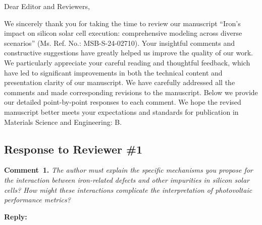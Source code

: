 \documentclass[a4paper,fleqn]{cas-sc}
\begin{document}
\shorttitle{}


%


Dear Editor and Reviewers,

We sincerely thank you for taking the time to review our manuscript
``Iron's impact on silicon solar cell execution: comprehensive modeling across diverse scenarios''
(Ms. Ref. No.: MSB-S-24-02710).
Your insightful comments and constructive suggestions have greatly helped us improve
the quality of our work.
We particularly appreciate your careful reading and thoughtful feedback, which have
led to significant improvements in both the technical content and presentation clarity of our manuscript.
We have carefully addressed all the comments and made corresponding revisions to the manuscript.
Below we provide our detailed point-by-point responses to
each comment.
We hope the revised manuscript better meets your expectations and standards for publication in Materials Science and Engineering: B.


\subsection*{Response to Reviewer \#1 }

\noindent
\textcolor[rgb]{0.00,0.50,1.00}{\textbf{Comment~1.}}
\emph{The author must explain the specific mechanisms you propose for the interaction between iron-related defects and other impurities in silicon solar cells? How might these interactions complicate the interpretation of photovoltaic performance metrics?}



\noindent
\textcolor[rgb]{0.51,0.00,0.00}{\textbf{Reply:}}
\end{document}
